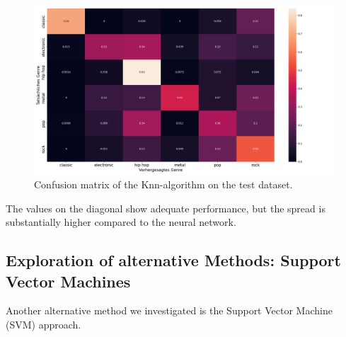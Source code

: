 \documentclass[
  12pt,
  bibliography=totoc,     %
  captions=tableheading,  %
  titlepage=firstiscover, %
]{scrartcl}
\begin{document}
\begin{figure}[H]
  \centering
  \includegraphics[scale=0.33]{figures/knn/confusion_matrix_knn.png}
  \caption{Confusion matrix of the Knn-algorithm on the test dataset.}
  \label{fig:conf_knn}
\end{figure}
\noindent
The values on the diagonal show adequate performance, but the spread is substantially higher compared to the neural network.

\subsection{Exploration of alternative Methods: Support Vector Machines}
Another alternative method we investigated is the Support Vector Machine (SVM) approach.


\end{document}
